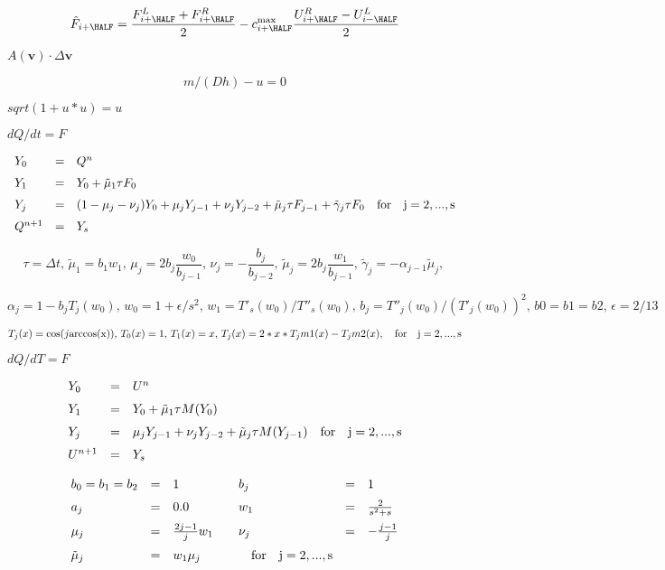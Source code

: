 \documentclass{article}
\begin{document}
\[
    \hat{F}_{i+\HALF} = \frac{F^L_{i+\HALF} + F^R_{i+\HALF}}{2}
 - c^{\rm max}_{i+\HALF}\frac{U^R_{i+\HALF} - U^L_{i-\HALF}}{2}
\]
\pagebreak

$ A(\mathbf{v})\cdot 
\Delta\mathbf{v} $
\pagebreak

\[
   m/(Dh) - u = 0
\]
\pagebreak

$ sqrt(1+u*u) = u $
\pagebreak

$ dQ/dt = F$
\pagebreak

\[ \begin{array}{lcl}
     Y_0  & = & Q^n                       \\ \noalign{\medskip}
     Y_1  & = & Y_0 + \tilde{\mu}_1\tau F_0   \\ \noalign{\medskip}
     Y_j  & = & (1 - \mu_j - \nu_j) Y_0 + \mu_j Y_{j-1} + \nu_j Y_{j-2}
            + \tilde{\mu}_j \tau F_{j-1} + \tilde{\gamma}_j\tau F_0  
           \quad \rm{for} \quad j = 2,...,s    \\ \noalign{\medskip}
   Q^{n+1} & = & Y_s
     \end{array}
 \]
\pagebreak

\[\tau = \Delta t,\, 
    \tilde{\mu}_1 = b_1 w_1,\,
    \mu_j = 2 b_j \frac{w_0}{b_{j-1}}, \,
    \nu_j = -\frac{b_j}{b_{j-2}},\,
    \tilde{\mu}_j = 2 b_j \frac{w_1}{b_{j-1}},\,
    \tilde{\gamma}_j = -\alpha_{j-1} \tilde{\mu}_j,\,
 \]
\pagebreak

\[   
    \alpha_j = 1 - b_j T_j(w_0),\,
    w_0 = 1 + \epsilon/s^2,\,
    w_1 = T'_s(w_0)/T''_s(w_0),\,
    b_j = T''_j(w_0)/(T'_j(w_0))^2,\,
    b0=b1=b2,\,
    \epsilon = 2/13     
  \]
\pagebreak

\[
    T_j(x) = \cos(j {\rm arccos(x)})  ,\,
    T_0(x) = 1,\,
    T_1(x)=x,\,
    T_j(x)=2*x*T_jm1(x) - T_jm2(x), \quad \rm{for}\quad j = 2,...,s  
  \]
\pagebreak

$ dQ/dT = F$
\pagebreak

\[ \begin{array}{lcl}
    Y_0 & = & U^n                            \\ \noalign{\medskip}
    Y_1 & = & Y_0 + \tilde{\mu}_1\tau M(Y_0) \\ \noalign{\medskip}
    Y_j & = & \mu_j Y_{j-1} + \nu_j Y_{j-2} + \tilde{\mu}_j \tau M(Y_{j-1}) 
          \quad \rm{for} \quad j = 2,...,s   \\ \noalign{\medskip}
    U^{n+1} & = & Y_s
    \end{array}
\]
\pagebreak

\[ \begin{array}{lclclcl}
    b_0 = b_1 = b_2 & = & 1 & &
    b_j & = & 1 \\ \noalign{\medskip}
    a_j & = & 0.0 & & w_1 & = & \frac{2}{s^2 + s} \\ \noalign{\medskip}
    \mu_j & = & \frac{2j - 1}{j} w_1 & &
    \nu_j & = & -\frac{j-1}{j} \\ \noalign{\medskip}
    \tilde{\mu}_j & = & w_1 \mu_j & & 
            \quad \rm{for} \quad j = 2,...,s   
    \end{array}
\]
\pagebreak
\end{document}
